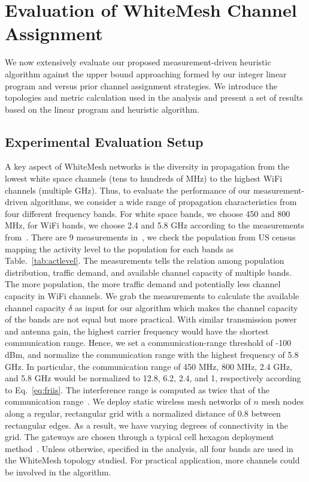\section{Evaluation of WhiteMesh Channel Assignment}
\label{sec:experimentdesign}


We now extensively evaluate our proposed measurement-driven heuristic algorithm against the upper 
bound approaching formed by our integer linear program and versus prior channel 
assignment strategies. We introduce the topologies and metric calculation used 
in the analysis and present a set of results based on the linear program and heuristic algorithm.

\subsection{Experimental Evaluation Setup}
\label{subsec:design}
A key aspect of WhiteMesh networks is the diversity in propagation from the lowest white
space channels (tens to hundreds of MHz) to the highest WiFi channels (multiple GHz). Thus, 
to evaluate the performance of our measurement-driven algorithms, we consider a wide range 
of propagation characteristics from four different frequency bands.  For white space bands, 
we choose 450 and 800 MHz, for WiFi bands, we choose 2.4 and 5.8 GHz according to the measurements
from~\cite{pcuiwinmee}. 
There are 9 measurements in~\cite{pcuiwinmee}, we check the population from US census~\cite{uscensus} mapping
the activity level to the population for each bands as Table.~\ref{tab:actlevel}.
The measurements tells the relation among population distribution, traffic demand,
and available channel capacity of multiple bands. The more population, the more traffic demand
and potentially less channel capacity in WiFi channels. We grab the measurements to calculate
the available channel capacity $\delta$ as input for our algorithm which makes the channel 
capacity of the bands are not equal but more practical. With similar transmission
power and antenna gain, the highest carrier frequency would have the shortest communication range.
Hence, we set a communication-range threshold of -100 dBm, and normalize the communication 
range with the highest frequency of 5.8 GHz. In particular, the communication range of 
450 MHz, 800 MHz, 2.4 GHz, and 5.8 GHz would be normalized to 12.8, 6.2, 2.4, and 1, respectively 
according to Eq.~\ref{eq:friis}. The interference range is computed as twice that of the communication 
range~\cite{raniwala2005architecture}. We deploy static wireless mesh networks of $n$ 
mesh nodes along a regular, rectangular grid with a normalized distance of 0.8 between rectangular edges. 
As a result, we have varying degrees of connectivity in the grid.
The gateways are chosen through a typical cell hexagon deployment method~\cite{meguerdichian2001exposure}.
Unless otherwise, specified in the analysis, all four bands are used in the WhiteMesh
topology studied. For practical application, more channels could be involved in the 
algorithm.

